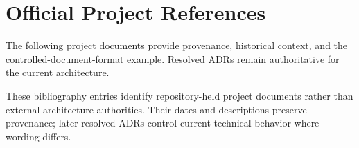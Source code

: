 \chapter{Official Project References}
\label{app:project-references}

The following project documents provide provenance, historical context, and the controlled-document-format example. Resolved ADRs remain authoritative for the current architecture.

\nocite{*}
\printbibliography[heading=none]

These bibliography entries identify repository-held project documents rather than external architecture authorities. Their dates and descriptions preserve provenance; later resolved ADRs control current technical behavior where wording differs.
